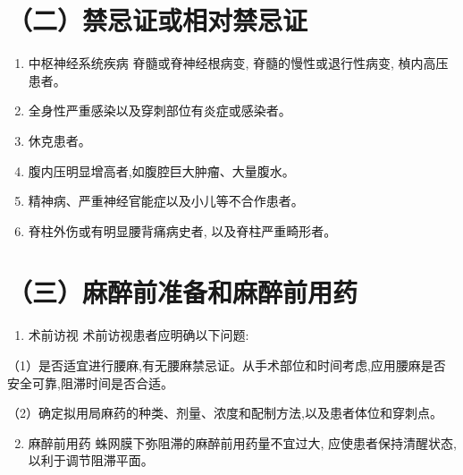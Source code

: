 \documentclass[10pt]{article}
\begin{document}
\section*{（二）禁忌证或相对禁忌证}
\begin{enumerate}
  \item 中枢神经系统疾病 脊髓或脊神经根病变, 脊髓的慢性或退行性病变, 楨内高压患者。

  \item 全身性严重感染以及穿刺部位有炎症或感染者。

  \item 休克患者。

  \item 腹内压明显增高者,如腹腔巨大肿瘤、大量腹水。

  \item 精神病、严重神经官能症以及小儿等不合作患者。

  \item 脊柱外伤或有明显腰背痛病史者, 以及脊柱严重畸形者。

\end{enumerate}

\section*{（三）麻醉前准备和麻醉前用药}
\begin{enumerate}
  \item 术前访视 术前访视患者应明确以下问题:
\end{enumerate}

（1）是否适宜进行腰麻,有无腰麻禁忌证。从手术部位和时间考虑,应用腰麻是否安全可靠,阻滞时间是否合适。

（2）确定拟用局麻药的种类、剂量、浓度和配制方法,以及患者体位和穿刺点。

\begin{enumerate}
  \setcounter{enumi}{1}
  \item 麻醉前用药 蛛网膜下弥阻滞的麻醉前用药量不宜过大, 应使患者保持清醒状态, 以利于调节阻滞平面。
\end{enumerate}
\end{document}
